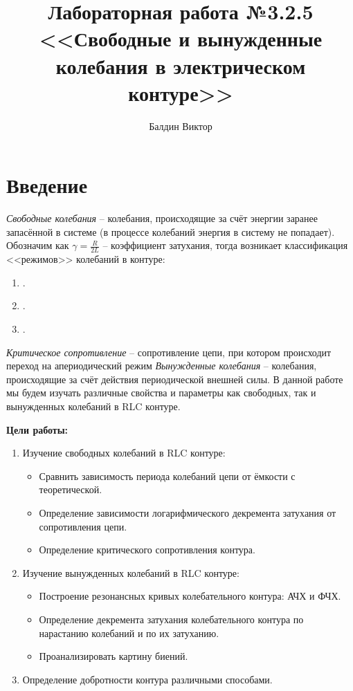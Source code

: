 \documentclass[a4paper,12pt]{extarticle}
\title{Лабораторная работа №3.2.5\\
       <<Свободные и вынужденные колебания в электрическом контуре>>}
\author{Балдин Виктор}
\begin{document}
\maketitle

\section{Введение}
\textit{Свободные колебания} -- колебания, происходящие за счёт энергии заранее запасённой в системе (в процессе колебаний энергия в систему не попадает). Обозначим как $\gamma = \frac{R}{2L}$ -- коэффициент затухания, тогда возникает классификация <<режимов>> колебаний в контуре:
\begin{enumerate}
    \item {}.
    \item {} .
    \item {}.
\end{enumerate}

\textit{Критическое сопротивление} -- сопротивление цепи, при котором происходит переход на апериодический режим
\textit{Вынужденные колебания} -- колебания, происходящие за счёт действия периодической внешней силы.
В данной работе мы будем изучать различные свойства и параметры как свободных, так и вынужденных колебаний в RLC контуре.


\textbf{Цели работы:}
\begin{enumerate}
    \item Изучение свободных колебаний в RLC контуре:
    \begin{itemize}
        \item Сравнить зависимость периода колебаний цепи от ёмкости с теоретической.
        \item Определение зависимости логарифмического декремента затухания от сопротивления цепи.
        \item Определение критического сопротивления контура.
    \end{itemize}
    \item Изучение вынужденных колебаний в RLC контуре:
    \begin{itemize}
        \item Построение резонансных кривых колебательного контура: АЧХ и ФЧХ.
        \item Определение декремента затухания колебательного контура по нарастанию колебаний и по их затуханию.
        \item Проанализировать картину биений.
    \end{itemize}
    \item Определение добротности контура различными способами.
\end{enumerate}
\end{document}
